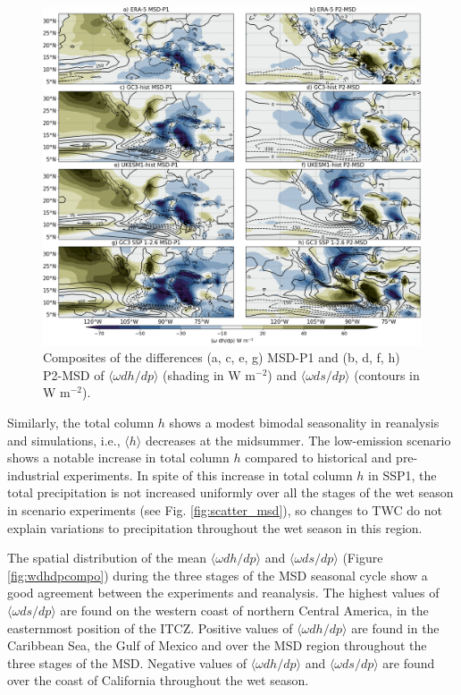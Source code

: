 \begin{figure}[t!]
\includegraphics[width=\linewidth]{figures/thermocompositewdhdpanom.png}
\caption[Composites of the anomalous vertical advection of the MSE budget]{Composites of the differences (a, c, e, g) MSD-P1 and (b, d, f, h) P2-MSD of $\langle \omega dh/dp \rangle$ (shading in W m$^{-2}$) and $\langle \omega ds/dp \rangle$ (contours in W m$^{-2}$).  }
\label{fig:wdhdpanom}
\end{figure} 
 
Similarly, the total column $h$ shows a modest bimodal seasonality in reanalysis and simulations, i.e., $\langle h \rangle$ decreases at the midsummer. 
The low-emission scenario shows a notable increase in total column $h$ compared to historical and pre-industrial experiments. In spite of this increase in total column $h$ in SSP1, the total precipitation is not increased uniformly over all the stages of the wet season in scenario experiments (see Fig. \ref{fig:scatter_msd}), so changes to TWC do not explain variations to precipitation throughout the wet season in this region.

The spatial distribution of the mean $\langle \omega dh/dp \rangle$ and $\langle \omega ds/dp \rangle$ (Figure \ref{fig:wdhdpcompo}) during the three stages of the MSD seasonal cycle show a good agreement between the experiments and reanalysis. The highest values of $\langle \omega ds/dp \rangle$ are found on the western coast of northern Central America, in the easternmost position of the ITCZ. Positive values of $\langle \omega dh/dp \rangle$  are found in the Caribbean Sea, the Gulf of Mexico and over the MSD region throughout the three stages of the MSD. Negative values of $\langle \omega dh/dp \rangle$ and $\langle \omega ds/dp \rangle$ are found over the coast of California throughout the wet season. 

